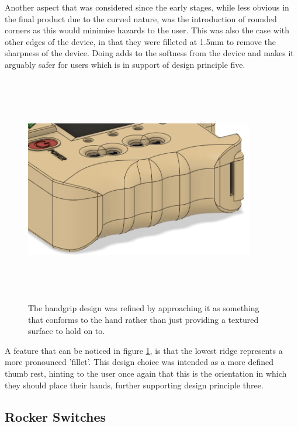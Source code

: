 Another aspect that was considered since the early stages, while less obvious in the final product due to the curved nature, was the introduction of rounded corners as this would minimise hazards to the user.
This was also the case with other edges of the device, in that they were filleted at 1.5mm to remove the sharpness of the device.
Doing adds to the softness from the device and makes it arguably safer for users which is in support of design principle five.

\begin{figure} [h]
    \centering
    \includegraphics[width=10cm,height=10cm,keepaspectratio]{Figures/handgrip_final.png}
    \caption{The handgrip design was refined by approaching it as something that conforms to the hand rather than just providing a textured surface to hold on to.}
    \label{fig:new_grips}
\end{figure}

A feature that can be noticed in figure \ref{fig:new_grips}, is that the lowest ridge represents a more pronounced 'fillet'.
This design choice was intended as a more defined thumb rest, hinting to the user once again that this is the orientation in which they should place their hands, further supporting design principle three.

\subsection{Rocker Switches}

